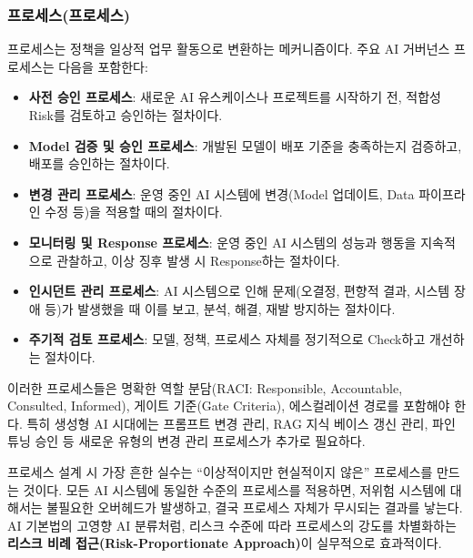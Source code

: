 \subsubsection*{프로세스(프로세스)}
프로세스는 정책을 일상적 업무 활동으로 변환하는 메커니즘이다. 주요 AI 거버넌스 프로세스는 다음을 포함한다:
\begin{itemize}
 \item \textbf{사전 승인 프로세스}: 새로운 AI 유스케이스나 프로젝트를 시작하기 전, 적합성 Risk를 검토하고 승인하는 절차이다.
 \item \textbf{Model 검증 및 승인 프로세스}: 개발된 모델이 배포 기준을 충족하는지 검증하고, 배포를 승인하는 절차이다.
 \item \textbf{변경 관리 프로세스}: 운영 중인 AI 시스템에 변경(Model 업데이트, Data 파이프라인 수정 등)을 적용할 때의 절차이다.
 \item \textbf{모니터링 및 Response 프로세스}: 운영 중인 AI 시스템의 성능과 행동을 지속적으로 관찰하고, 이상 징후 발생 시 Response하는 절차이다.
 \item \textbf{인시던트 관리 프로세스}: AI 시스템으로 인해 문제(오결정, 편향적 결과, 시스템 장애 등)가 발생했을 때 이를 보고, 분석, 해결, 재발 방지하는 절차이다.
 \item \textbf{주기적 검토 프로세스}: 모델, 정책, 프로세스 자체를 정기적으로 Check하고 개선하는 절차이다.
\end{itemize}
이러한 프로세스들은 명확한 역할 분담(RACI: Responsible, Accountable, Consulted, Informed), 게이트 기준(Gate Criteria), 에스컬레이션 경로를 포함해야 한다. 특히 생성형 AI 시대에는 프롬프트 변경 관리, RAG 지식 베이스 갱신 관리, 파인튜닝 승인 등 새로운 유형의 변경 관리 프로세스가 추가로 필요하다.

프로세스 설계 시 가장 흔한 실수는 ``이상적이지만 현실적이지 않은'' 프로세스를 만드는 것이다. 모든 AI 시스템에 동일한 수준의 프로세스를 적용하면, 저위험 시스템에 대해서는 불필요한 오버헤드가 발생하고, 결국 프로세스 자체가 무시되는 결과를 낳는다. AI 기본법의 고영향 AI 분류처럼, 리스크 수준에 따라 프로세스의 강도를 차별화하는 \textbf{리스크 비례 접근(Risk-Proportionate Approach)}이 실무적으로 효과적이다.


